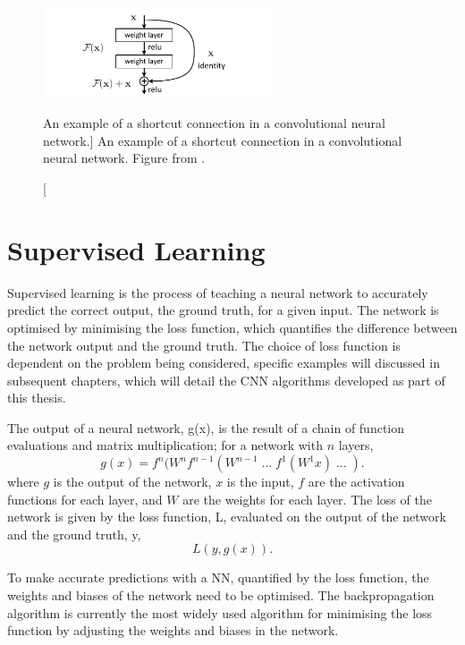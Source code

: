 \begin{figure}

	\centering

	\includegraphics[width = 0.6\textwidth]{figures/short_connect.pdf}

	\caption
	[An example of a shortcut connection in a convolutional neural network.]
	{ An example of a shortcut connection in a convolutional neural network.
	Figure from \cite{He_2016_CVPR}.}

	\label{fig:short_connect}

\end{figure}

\section{Supervised Learning}
Supervised learning is the process of teaching a neural network to accurately
predict the correct output, the ground truth, for a given input. The network is 
optimised by minimising the loss function, which quantifies the difference 
between the network output and the ground truth. The choice of loss function 
is dependent on the problem being considered, specific examples will discussed 
in subsequent chapters, which will detail the CNN algorithms developed as part 
of this thesis.

The output of a neural network, g(x), is the result of a chain of function 
evaluations and matrix multiplication; for a network with $n$ layers,
\begin{equation}
	g(x) = f^n(W^n f^{n-1}(W^{n-1} \;...\; f^1(W^1 x) \;...\; ).
\end{equation}
where $g$ is the output of the network, $x$ is the input, $f$ are the 
activation functions for each layer, and $W$ are the weights for each layer. 
The loss of the network is given by the loss function, L,  evaluated on the 
output of the network and the ground truth, y,
\begin{equation}
	L(y, g(x)).
\end{equation}

To make accurate predictions with a NN, quantified by the loss function, the
weights and biases of the network need to be optimised. The backpropagation
algorithm\cite{Rumelhart1986} is currently the most widely used algorithm for
minimising the loss function by adjusting the weights and biases in the network.

